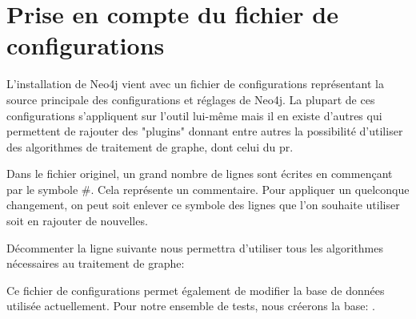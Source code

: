 \documentclass[12pt,twoside, openright]{memoir}
\newcommand{\courrier}[1]{{\fontfamily{qcr}\selectfont {#1}}}
\begin{document}
	\section{Prise en compte du fichier de configurations}
	L'installation de Neo4j vient avec un fichier de configurations \courrier{neo4j.conf} représentant la source principale des configurations et réglages de Neo4j. La plupart de ces configurations s'appliquent sur l'outil lui-même mais il en existe d'autres qui permettent de rajouter des "plugins" donnant entre autres la possibilité d'utiliser des algorithmes de traitement de graphe, dont celui du \gls{pr}.\par
	Dans le fichier originel, un grand nombre de lignes sont écrites en commençant par le symbole \#. Cela représente un commentaire. Pour appliquer un quelconque changement, on peut soit enlever ce symbole des lignes que l'on souhaite utiliser soit en rajouter de nouvelles.\par
	Décommenter la ligne suivante nous permettra d'utiliser tous les algorithmes nécessaires au traitement de graphe:
	\begin{center}
		\courrier{dbms.security.procedures.unrestricted=
			apoc.trigger.*,algo.*,apoc.*}
	\end{center}
	Ce fichier de configurations permet également de modifier la base de données utilisée actuellement. Pour notre ensemble de tests, nous créerons la base: \courrier{graph.db}.
\end{document}
